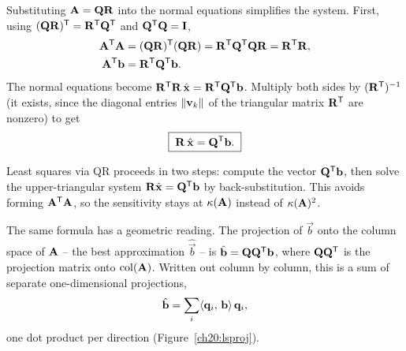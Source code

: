 Substituting $\mathbf{A}=\mathbf{Q}\mathbf{R}$ into the normal equations simplifies the system.
First, using $(\mathbf{Q}\mathbf{R})^{\mathsf{T}}=\mathbf{R}^{\mathsf{T}}\mathbf{Q}^{\mathsf{T}}$ and $\mathbf{Q}^{\mathsf{T}}\mathbf{Q}=\mathbf{I}$,
\begin{align*}
  \mathbf{A}^{\mathsf{T}}\mathbf{A} &= (\mathbf{Q}\mathbf{R})^{\mathsf{T}}(\mathbf{Q}\mathbf{R})
                    = \mathbf{R}^{\mathsf{T}}\mathbf{Q}^{\mathsf{T}}\mathbf{Q}\mathbf{R}
                    = \mathbf{R}^{\mathsf{T}}\mathbf{R},\\
  \mathbf{A}^{\mathsf{T}}\mathbf{b} &= \mathbf{R}^{\mathsf{T}}\mathbf{Q}^{\mathsf{T}}\mathbf{b}.
\end{align*}
The normal equations become
$\mathbf{R}^{\mathsf{T}}\mathbf{R}\,\hat{\mathbf{x}}=\mathbf{R}^{\mathsf{T}}\mathbf{Q}^{\mathsf{T}}\mathbf{b}$. Multiply both sides by
$(\mathbf{R}^{\mathsf{T}})^{-1}$ (it exists, since the diagonal entries $\lVert\mathbf{v}_k\rVert$ of the
triangular matrix $\mathbf{R}^{\mathsf{T}}$ are nonzero) to get
\[
  \boxed{\;\mathbf{R}\,\hat{\mathbf{x}} = \mathbf{Q}^{\mathsf{T}}\mathbf{b}.\;}
\]

\begin{focusbox}
Least squares via QR proceeds in two steps: compute the vector $\mathbf{Q}^{\mathsf{T}}\mathbf{b}$,
then solve the upper-triangular system $\mathbf{R}\hat{\mathbf{x}}=\mathbf{Q}^{\mathsf{T}}\mathbf{b}$ by
back-substitution. This avoids forming $\mathbf{A}^{\mathsf{T}}\mathbf{A}$, so the sensitivity stays at
$\kappa(\mathbf{A})$ instead of $\kappa(\mathbf{A})^2$.
\end{focusbox}

The same formula has a geometric reading. The projection of $\vec{b}$ onto the column
space of $\mathbf{A}$ -- the best approximation $\hat{\vec{b}}$ -- is
$\hat{\mathbf{b}}=\mathbf{Q}\mathbf{Q}^{\mathsf{T}}\mathbf{b}$, where $\mathbf{Q}\mathbf{Q}^{\mathsf{T}}$ is the projection
matrix onto $\operatorname{col}(\mathbf{A})$. Written out column by column, this is a sum of separate
one-dimensional projections,
\[
  \hat{\mathbf{b}}=\sum_i \langle \mathbf{q}_i,\, \mathbf{b} \rangle\,\mathbf{q}_i,
\]
one dot product per direction (Figure~\ref{ch20:lsproj}).

